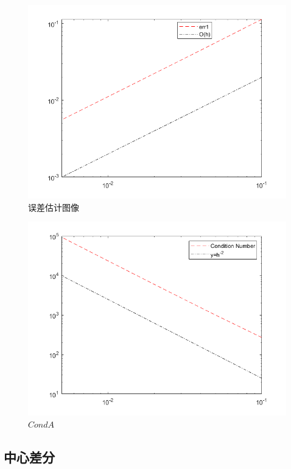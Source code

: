 \documentclass{article}
\begin{document}
\begin{figure}[H]
{\begin{minipage}[t]{0.3\linewidth}
\includegraphics[scale=0.3]{向后差分/err1.png}
\end{minipage}
}
\caption{\label{solution_image}误差估计图像}
\end{figure}

\begin{figure}[H]
\centering
\includegraphics[scale=0.45]{向后差分/CondA.png}
\caption{\label{CondA}$CondA$}
\end{figure}

\newpage
\subsection{中心差分}
\end{document}
